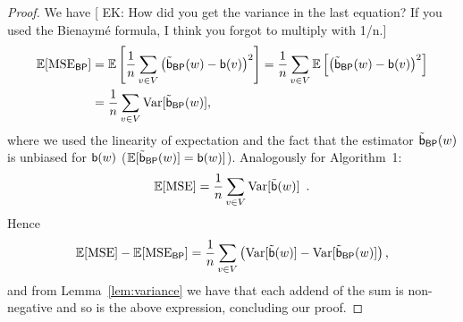 \begin{proof}
  We have
  [ EK: How did you get the variance in the last equation? If you used the Bienaymé formula, I think
  you forgot to multiply with 1/n.]
  \begin{align*}
  \mathbb{E}[\mathrm{MSE}_\mathsf{BP}] &= \mathbb{E}\left[\frac{1}{n}\sum_{v\in
  V}\left(\tilde{\mathsf{b}}_\mathsf{BP}(w)-\mathsf{b}(v)\right)^2\right]=\frac{1}{n}\sum_{v\in
  V}\mathbb{E}\left[\left(\tilde{\mathsf{b}}_\mathsf{BP}(w)-\mathsf{b}(v)\right)^2\right]\\
  &=\frac{1}{n}\sum_{v\in V}\mathrm{Var}[\tilde{\mathsf{b}}_\mathsf{BP}(w)],
  \end{align*}
  where we used the linearity of expectation and the fact that the estimator
  $\tilde{\mathsf{b}}_\mathsf{BP}(w)$ is unbiased for $\mathsf{b}(w)$ ($\mathbb{E}[\tilde{\mathsf{b}}_\mathsf{BP}(w)]=\mathsf{b}(w)]$).
  Analogously for Algorithm~1:
  \[
  \mathbb{E}[\mathrm{MSE}] = \frac{1}{n}\sum_{v\in V}\mathrm{Var}[\tilde{\mathsf{b}}(w)]\enspace.
  \]
  Hence
  \[
  \mathbb{E}[\mathrm{MSE}]-\mathbb{E}[\mathrm{MSE}_\mathsf{BP}]=\frac{1}{n}\sum_{v\in
  V}\left(\mathrm{Var}[\tilde{\mathsf{b}}(w)]-\mathrm{Var}[\tilde{\mathsf{b}}_\mathsf{BP}(w)]\right),
  \]
  and from Lemma~\ref{lem:variance} we have that each addend of the sum is
  non-negative and so is the above expression, concluding our proof.
\end{proof}

